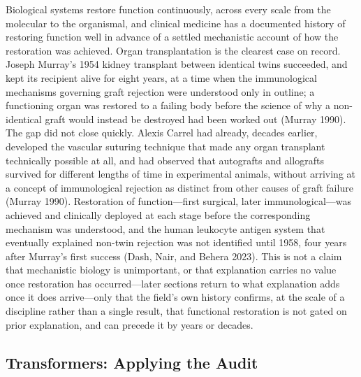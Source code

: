 \documentclass[11pt]{article}
\theoremstyle{plain}
\begin{document}
Biological systems restore function continuously, across every scale from the molecular to the organismal, and clinical medicine has a documented history of restoring function well in advance of a settled mechanistic account of how the restoration was achieved. Organ transplantation is the clearest case on record. Joseph Murray's 1954 kidney transplant between identical twins succeeded, and kept its recipient alive for eight years, at a time when the immunological mechanisms governing graft rejection were understood only in outline; a functioning organ was restored to a failing body before the science of why a non-identical graft would instead be destroyed had been worked out (Murray 1990). The gap did not close quickly. Alexis Carrel had already, decades earlier, developed the vascular suturing technique that made any organ transplant technically possible at all, and had observed that autografts and allografts survived for different lengths of time in experimental animals, without arriving at a concept of immunological rejection as distinct from other causes of graft failure (Murray 1990). Restoration of function---first surgical, later immunological---was achieved and clinically deployed at each stage before the corresponding mechanism was understood, and the human leukocyte antigen system that eventually explained non-twin rejection was not identified until 1958, four years after Murray's first success (Dash, Nair, and Behera 2023). This is not a claim that mechanistic biology is unimportant, or that explanation carries no value once restoration has occurred---later sections return to what explanation adds once it does arrive---only that the field's own history confirms, at the scale of a discipline rather than a single result, that functional restoration is not gated on prior explanation, and can precede it by years or decades.

\subsection{Transformers: Applying the Audit}
\end{document}
